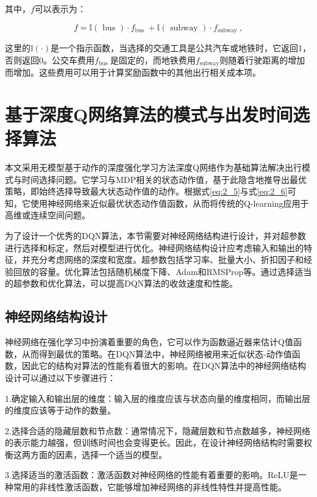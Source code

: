 其中，$f$可以表示为：

\begin{equation}
f=\mathbb{I}(\text { bus }) \cdot f_{\text {bus }}+\mathbb{I}(\text { subway }) \cdot f_{\text {subway }},
\end{equation}

这里的$\mathbb{I}(\cdot)$是一个指示函数，当选择的交通工具是公共汽车或地铁时，它返回1，否则返回0。公交车费用$f_{\text {bus }}$是固定的，而地铁费用$f_{\text {subway} }$则随着行驶距离的增加而增加。这些费用可以用于计算奖励函数中的其他出行相关成本项。

\section{基于深度Q网络算法的模式与出发时间选择算法}

本文采用无模型基于动作的深度强化学习方法深度Q网络作为基础算法解决出行模式与时间选择问题。它学习与MDP相关的状态动作值，基于此隐含地推导出最优策略，即始终选择导致最大状态动作值的动作。根据式\ref{eq:2_5}与式\ref{eq:2_6}可知，它使用神经网络来近似最优状态动作值函数，从而将传统的Q-learning应用于高维或连续空间问题。

为了设计一个优秀的DQN算法，本节需要对神经网络结构进行设计，并对超参数进行选择和标定，然后对模型进行优化。神经网络结构设计应考虑输入和输出的特征，并充分考虑网络的深度和宽度。超参数包括学习率、批量大小、折扣因子和经验回放的容量。优化算法包括随机梯度下降、Adam和RMSProp等。通过选择适当的超参数和优化算法，可以提高DQN算法的收敛速度和性能。

\subsection{神经网络结构设计}


神经网络在强化学习中扮演着重要的角色，它可以作为函数逼近器来估计Q值函数，从而得到最优的策略。在DQN算法中，神经网络被用来近似状态-动作值函数，因此它的结构对算法的性能有着很大的影响。在DQN算法中的神经网络结构设计可以通过以下步骤进行：

1.确定输入和输出层的维度：输入层的维度应该与状态向量的维度相同，而输出层的维度应该等于动作的数量。

2.选择合适的隐藏层数和节点数：通常情况下，隐藏层数和节点数越多，神经网络的表示能力越强，但训练时间也会变得更长。因此，在设计神经网络结构时需要权衡这两方面的因素，选择一个适当的模型。

3.选择适当的激活函数：激活函数对神经网络的性能有着重要的影响。ReLU是一种常用的非线性激活函数，它能够增加神经网络的非线性特性并提高性能。

